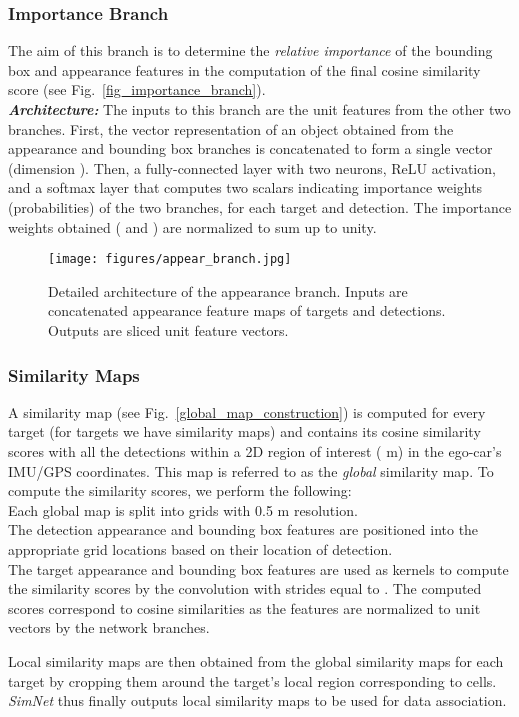 \documentclass[letterpaper, 10 pt, conference]{ieeeconf}
\begin{document}
\subsubsection{Importance Branch}
The aim of this branch is to determine the \textit{relative importance} of the bounding box and appearance features in the computation of the final cosine similarity score (see Fig.~\ref{fig_importance_branch}). 
\\\textbf{\textit{Architecture:}} The inputs to this branch are the unit features from the other two branches.  First, the vector representation of an object obtained from the appearance and bounding box branches is concatenated to form a single vector (dimension ). Then, a fully-connected layer with two neurons, ReLU activation, and a softmax layer that computes two scalars indicating importance weights (probabilities) of the two branches, for each target and detection. The importance weights obtained ( and ) are normalized to sum up to unity.
\begin{figure}[ht]
\vspace{1.5em}
\begin{center}
\texttt{[image: figures/appear\_branch.jpg]}
\end{center}
\caption{Detailed architecture of the appearance branch. Inputs are concatenated appearance feature maps of targets and detections. Outputs are sliced unit feature vectors.}
\label{fig_appear_branch}
\vspace{-1.5em}
\end{figure}


\subsubsection{Similarity Maps}
 A similarity map (see Fig.~\ref{global_map_construction}) is computed for every target (for  targets we have  similarity maps) and contains its cosine similarity scores with all the detections within a 2D region of interest ( \si{\m}) in the ego-car's IMU/GPS coordinates. This map is referred to as the \textit{global} similarity map. To compute the similarity scores, we perform the following:
 \\  Each global map is split into grids with 0.5 \si{\m} resolution.
 \\  The detection appearance and bounding box features are positioned into the appropriate grid locations based on their location of detection.
 \\  The target appearance and bounding box features are used as kernels to compute the similarity scores by the convolution with strides equal to . The computed scores correspond to cosine similarities as the features are normalized to unit vectors by the network branches. 
 \par Local similarity maps are then obtained from the global similarity maps for each target by cropping them around the target's local  region corresponding to  cells. \textit{SimNet} thus finally outputs  local similarity maps to be used for data association.
 
\end{document}

